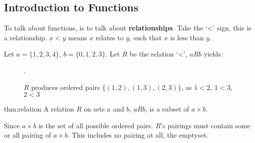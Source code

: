 \subsection{Introduction to Functions}
To talk about functions, is to talk about \textbf{relationships}. Take the `<' sign, this
is a relationship. $x < y$ means $x$ relates to $y$, such that $x$ is less than $y$.\\

\noindent
\begin{center}
    Let $a=\{1,2,3,4\}$, $b=\{0,1,2,3\}$. Let $R$ be the relation `<', $aRb$ yields:
\end{center}

\vspace{1em}
\begin{figure}[ht]
    \centering
    \caption{\centering $R$ produces ordered pairs $\{(1,2),(1,3),(2,3)\}$, as $1<2$, $1<3$, $2<3$}.
    \label{fig:relates}
\end{figure}

\begin{Def}[Relation]{thm:relation}
    A relation $R$ on sets $a$ and $b$, $aRb$, is a subset of $a\times b$.
\end{Def}

\noindent
Since $a\times b$ is the set of all possible ordered pairs. $R$'s pairings must contain some or
all pairing of $a\times b$. This includes no pairing at all, the emptyset.\\

